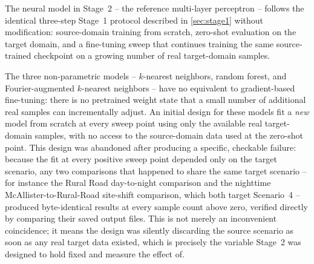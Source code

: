 \documentclass{iutbscthesis}
\begin{document}
The neural model in Stage~2 -- the reference multi-layer perceptron -- follows the identical three-step Stage~1 protocol described in \autoref{sec:stage1} without modification: source-domain training from scratch, zero-shot evaluation on the target domain, and a fine-tuning sweep that continues training the same source-trained checkpoint on a growing number of real target-domain samples.

The three non-parametric models -- $k$-nearest neighbors, random forest, and Fourier-augmented $k$-nearest neighbors -- have no equivalent to gradient-based fine-tuning: there is no pretrained weight state that a small number of additional real samples can incrementally adjust. An initial design for these models fit a \emph{new} model from scratch at every sweep point using only the available real target-domain samples, with no access to the source-domain data used at the zero-shot point. This design was abandoned after producing a specific, checkable failure: because the fit at every positive sweep point depended only on the target scenario, any two comparisons that happened to share the same target scenario -- for instance the Rural Road day-to-night comparison and the nighttime McAllister-to-Rural-Road site-shift comparison, which both target Scenario~4 -- produced byte-identical results at every sample count above zero, verified directly by comparing their saved output files. This is not merely an inconvenient coincidence; it means the design was silently discarding the source scenario as soon as any real target data existed, which is precisely the variable Stage~2 was designed to hold fixed and measure the effect of.
\end{document}
